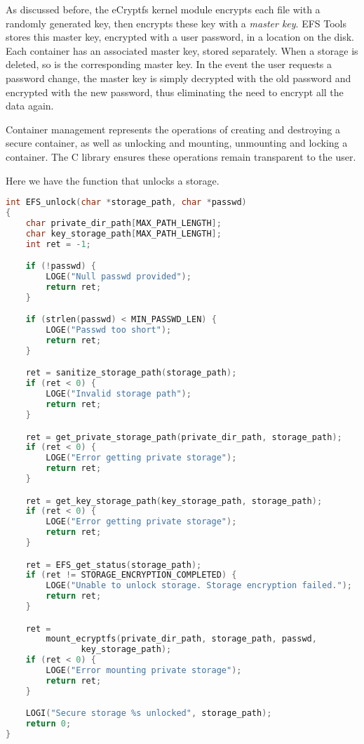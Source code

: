 As discussed before, the eCryptfs kernel module encrypts each file with a randomly generated key, then encrypts these key with a \textit{master key}. EFS Tools stores this master key, encrypted with a user password, in a location on the disk. Each container has an associated master key, stored separately. When a storage is deleted, so is the corresponding master key. In the event the user requests a password change, the master key is simply decrypted with the old password and encrypted with the new password, thus eliminating the need to encrypt all the data again.

Container management represents the operations of creating and destroying a secure container, as well as unlocking and mounting, unmounting and locking a container. The C library ensures these operations remain transparent to the user.

Here we have the function that unlocks a storage.

\begin{lstlisting}[basicstyle=\small, language=C, caption=EFS unlock operation, label=lst:efs-unlock]
int EFS_unlock(char *storage_path, char *passwd)
{
    char private_dir_path[MAX_PATH_LENGTH];
    char key_storage_path[MAX_PATH_LENGTH];
    int ret = -1;

    if (!passwd) {
        LOGE("Null passwd provided");
        return ret;
    }

    if (strlen(passwd) < MIN_PASSWD_LEN) {
        LOGE("Passwd too short");
        return ret;
    }

    ret = sanitize_storage_path(storage_path);
    if (ret < 0) {
        LOGE("Invalid storage path");
        return ret;
    }

    ret = get_private_storage_path(private_dir_path, storage_path);
    if (ret < 0) {
        LOGE("Error getting private storage");
        return ret;
    }

    ret = get_key_storage_path(key_storage_path, storage_path);
    if (ret < 0) {
        LOGE("Error getting private storage");
        return ret;
    }

    ret = EFS_get_status(storage_path);
    if (ret != STORAGE_ENCRYPTION_COMPLETED) {
        LOGE("Unable to unlock storage. Storage encryption failed.");
        return ret;
    }

    ret =
        mount_ecryptfs(private_dir_path, storage_path, passwd,
               key_storage_path);
    if (ret < 0) {
        LOGE("Error mounting private storage");
        return ret;
    }

    LOGI("Secure storage %s unlocked", storage_path);
    return 0;
}
\end{lstlisting}

